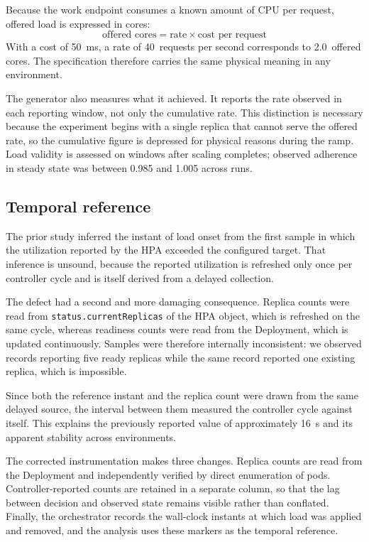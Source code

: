 \documentclass[conference]{IEEEtran}
\begin{document}
Because the work endpoint consumes a known amount of CPU per request, offered
load is expressed in cores:
\begin{equation}
\text{offered cores} = \text{rate} \times \text{cost per request}
\end{equation}
With a cost of 50~ms, a rate of 40~requests per second corresponds to
2.0~offered cores. The specification therefore carries the same physical meaning
in any environment.

The generator also measures what it achieved. It reports the rate observed in
each reporting window, not only the cumulative rate. This distinction is
necessary because the experiment begins with a single replica that cannot serve
the offered rate, so the cumulative figure is depressed for physical reasons
during the ramp. Load validity is assessed on windows after scaling completes;
observed adherence in steady state was between 0.985 and 1.005 across runs.

\subsection{Temporal reference}
\label{sec:artifact}

The prior study inferred the instant of load onset from the first sample in
which the utilization reported by the HPA exceeded the configured target. That
inference is unsound, because the reported utilization is refreshed only once
per controller cycle and is itself derived from a delayed collection.

The defect had a second and more damaging consequence. Replica counts were read
from \texttt{status.currentReplicas} of the HPA object, which is refreshed on
the same cycle, whereas readiness counts were read from the Deployment, which is
updated continuously. Samples were therefore internally inconsistent: we observed
records reporting five ready replicas while the same record reported one
existing replica, which is impossible.

Since both the reference instant and the replica count were drawn from the same
delayed source, the interval between them measured the controller cycle against
itself. This explains the previously reported value of approximately 16~s and
its apparent stability across environments.

The corrected instrumentation makes three changes. Replica counts are read from
the Deployment and independently verified by direct enumeration of pods.
Controller-reported counts are retained in a separate column, so that the lag
between decision and observed state remains visible rather than conflated.
Finally, the orchestrator records the wall-clock instants at which load was
applied and removed, and the analysis uses these markers as the temporal
reference.
\end{document}
